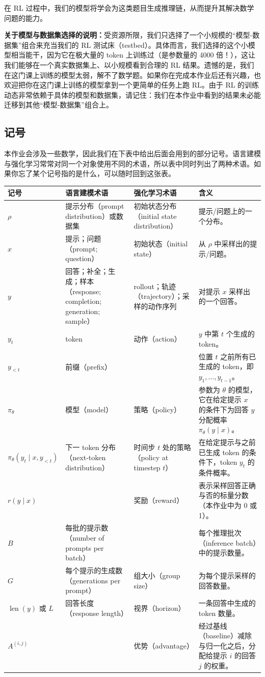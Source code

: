 在 RL 过程中，我们的模型将学会为这类题目生成推理链，从而提升其解决数学问题的能力。

\noindent\textbf{关于模型与数据集选择的说明：}受资源所限，我们只选择了一个小规模的“模型-数据集”组合来充当我们的 RL 测试床（testbed）。具体而言，我们选择的这个小模型相当能干，因为它在极大量的 token 上训练过（是参数量的 4000 倍！），这让我们能够在一个真实数据集上、以小规模看到合理的 RL 结果。遗憾的是，我们在这门课上训练的模型太弱，解不了数学题。如果你在完成本作业后还有兴趣，也欢迎把你在这门课上训练的模型拿到一个更简单的任务上跑 RL。由于 RL 的训练动态非常依赖于具体的模型和数据集，请记住：我们在本作业中看到的结果未必能迁移到其他“模型-数据集”组合上。

\subsection{记号}

本作业会涉及一些数学，因此我们在下表中给出后面会用到的部分记号。语言建模与强化学习常常对同一个对象使用不同的术语，所以表中同时列出了两种术语。如果你忘了某个记号指的是什么，可以随时回到这张表。

\begin{longtable}{@{}lp{2.8cm}p{3.0cm}p{5.6cm}@{}}
\toprule
记号 & 语言建模术语 & 强化学习术语 & 含义 \\
\midrule
\endhead
$\rho$ & 提示分布（prompt distribution）或数据集 & 初始状态分布（initial state distribution） & 提示/问题上的一个分布。 \\
$x$ & 提示；问题（prompt; question） & 初始状态（initial state） & 从 $\rho$ 中采样出的提示/问题。 \\
$y$ & 回答；补全；生成；样本（response; completion; generation; sample） & rollout；轨迹（trajectory）；采样的动作序列 & 对提示 $x$ 采样出的一个回答。 \\
$y_t$ & token & 动作（action） & $y$ 中第 $t$ 个生成的 token。 \\
$y_{<t}$ & 前缀（prefix） & & 位置 $t$ 之前所有已生成的 token，即 $y_1, \dots, y_{t-1}$。 \\
$\pi_\theta$ & 模型（model） & 策略（policy） & 参数为 $\theta$ 的模型，它在给定提示 $x$ 的条件下为回答 $y$ 分配概率 $\pi_\theta(y \mid x)$。 \\
$\pi_\theta(y_t \mid x, y_{<t})$ & 下一 token 分布（next-token distribution） & 时间步 $t$ 处的策略（policy at timestep $t$） & 在给定提示与之前已生成 token 的条件下，token $y_t$ 的条件概率。 \\
$r(y \mid x)$ & & 奖励（reward） & 表示采样回答正确与否的标量分数（本作业中为 0 或 1）。 \\
$B$ & 每批的提示数（number of prompts per batch） & & 每个推理批次（inference batch）中的提示数量。 \\
$G$ & 每个提示的生成数（generations per prompt） & 组大小（group size） & 为每个提示采样的回答数量。 \\
$\operatorname{len}(y)$ 或 $L$ & 回答长度（response length） & 视界（horizon） & 一条回答中生成的 token 数量。 \\
$A^{(i,j)}$ & & 优势（advantage） & 经过基线（baseline）减除与归一化之后，分配给提示 $i$ 的回答 $j$ 的权重。 \\
\bottomrule
\end{longtable}

